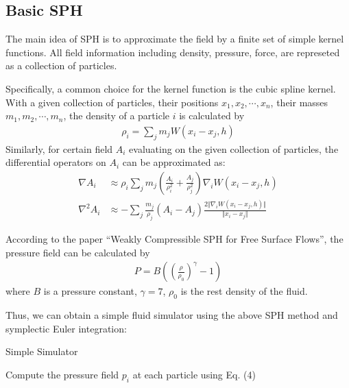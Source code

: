 \documentclass[acmlarge]{acmart}
\begin{document}
\subsection{Basic SPH}

The main idea of SPH is to approximate the field by a finite set of simple kernel functions.
All field information including density, pressure, force, are represeted as a collection of particles.

Specifically, a common choice for the kernel function is the cubic spline kernel.
With a given collection of particles, their positions $x_1,x_2,\cdots,x_n$, their masses $m_1,m_2,\cdots,m_n$,
the density of a particle $i$ is calculated by
\begin{align}
  \rho_i=\sum_j m_j W(x_i-x_j,h)
\end{align}
Similarly, for certain field $A_i$ evaluating on the given collection of particles, 
the differential operators on $A_i$ can be approximated as:
\begin{align}
  \nabla A_i &\approx \rho_i \sum_j m_j (\frac{A_i}{\rho_i^2}+\frac{A_j}{\rho_j^2})\nabla_i W(x_i-x_j,h)\\
  \nabla^2 A_i &\approx -\sum_j \frac{m_j}{\rho_j}(A_i-A_j)\frac{2\Vert \nabla_i W(x_i-x_j,h) \Vert}{\Vert x_i-x_j \Vert}
\end{align}

According to the paper ``Weakly Compressible SPH for Free Surface Flows''\cite{WCSPH},
the pressure field can be calculated by
\begin{align}
  P=B((\frac{\rho}{\rho_0})^\gamma-1)
\end{align}
where $B$ is a pressure constant, $\gamma=7$, $\rho_0$ is the rest density of the fluid.

Thus, we can obtain a simple fluid simulator using the above SPH method and symplectic Euler integration:
\begin{algorithm}[!h]
  \caption{Simple Simulator}
  Compute the pressure field $p_i$ at each particle using Eq. (4) \;
\end{algorithm}
\end{document}
